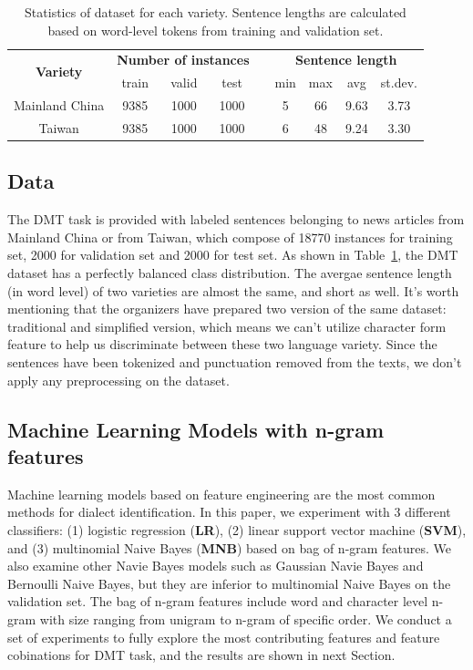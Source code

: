 \documentclass[11pt,a4paper]{article}
\begin{document}
\begin{table}[]
\centering
\begin{tabular}{cccclcccc}
\hline
\multirow{2}{*}{\textbf{Variety}} & \multicolumn{3}{c}{\textbf{Number of instances}} &                      & \multicolumn{4}{c}{\textbf{Sentence length}} \\ \cline{2-4} \cline{6-9} 
                                  & train           & valid          & test          & \multicolumn{1}{c}{} & min      & max      & avg      & st.dev.     \\ \hline
Mainland China                    & 9385            & 1000           & 1000          &                      & 5        & 66       & 9.63     & 3.73        \\
Taiwan                            & 9385            & 1000           & 1000          &                      & 6        & 48       & 9.24     & 3.30        \\ \hline
\end{tabular}
\caption{Statistics of dataset for each variety. Sentence lengths are calculated based on word-level tokens from training and validation set.}
\label{data staticstics}
\end{table}

\subsection{Data\label{data}}
The DMT task is provided with labeled sentences belonging to news articles from Mainland China or from Taiwan, which compose of 18770 instances for training set, 2000 for validation set and 2000 for test set. As shown in Table~\ref{data staticstics},  the DMT dataset has a perfectly balanced class distribution. The avergae sentence length (in word level) of two varieties are almost the same, and short as well. It's worth mentioning that the organizers have prepared two version of the same dataset: traditional and simplified version, which means we can't utilize character form feature to help us discriminate between these two language variety.  Since the sentences have been tokenized and punctuation removed from the texts, we don't apply any preprocessing on the dataset.

\subsection{Machine Learning Models with n-gram features\label{ml models}}
Machine learning models based on feature engineering are the most common methods for dialect identification. In this paper, we experiment with 3 different classifiers: (1) logistic regression (\textbf{LR}), (2) linear support vector machine (\textbf{SVM}), and (3) multinomial Naive Bayes (\textbf{MNB}) based on bag of n-gram features. We also examine other Navie Bayes models such as Gaussian Navie Bayes and Bernoulli Naive Bayes, but they are inferior to multinomial Naive Bayes on the validation set. The bag of n-gram features include word and character level n-gram with size ranging from unigram to n-gram of specific order. We conduct a set of experiments to fully explore the most contributing features and feature cobinations for DMT task, and the results are shown in next Section.
\end{document}
